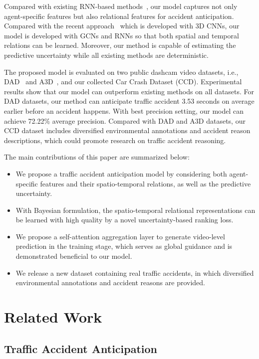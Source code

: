 \documentclass[sigconf]{acmart}
\begin{document}
Compared with existing RNN-based methods~\cite{ChanACCV2016,SuzukiCVPR2018}, our model captures not only agent-specific features but also relational features for accident anticipation. Compared with the recent approach~\cite{NeumannCVPRW2019} which is developed with 3D CNNs, our model is developed with GCNs and RNNs so that both spatial and temporal relations can be learned. Moreover, our method is capable of estimating the predictive uncertainty while all existing methods are deterministic.

The proposed model is evaluated on two public dashcam video datasets, i.e., DAD~\cite{ChanACCV2016} and A3D~\cite{SuzukiCVPR2018}, and our collected Car Crash Dataset (CCD). Experimental results show that our model can outperform existing methods on all datasets. For DAD datasets, our method can anticipate traffic accident 3.53 seconds on average earlier before an accident happens. With best precision setting, our model can achieve 72.22\% average precision. Compared with DAD and A3D datasets, our CCD dataset includes diversified environmental annotations and accident reason descriptions, which could promote research on traffic accident reasoning.

The main contributions of this paper are summarized below:
\begin{itemize}
    \item We propose a traffic accident anticipation model by considering both agent-specific features and their spatio-temporal relations, as well as the predictive uncertainty.
    \item With Bayesian formulation, the spatio-temporal relational representations can be learned with high quality by a novel uncertainty-based ranking loss.
    \item We propose a self-attention aggregation layer to generate video-level prediction in the training stage, which serves as global guidance and is demonstrated beneficial to our model.
    \item We release a new dataset containing real traffic accidents, in which diversified environmental annotations and accident reasons are provided.
\end{itemize}

\section{Related Work}

\subsection{Traffic Accident Anticipation}
\end{document}
